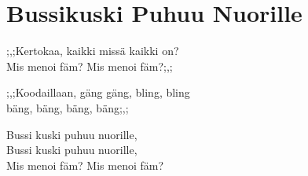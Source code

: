 \section{Bussikuski Puhuu Nuorille}
;,;Kertokaa, kaikki missä kaikki on?\\
Mis menoi fäm? Mis menoi fäm?;,;

;,;Koodaillaan, gäng gäng, bling, bling\\
bäng, bäng, bäng, bäng;,;

Bussi kuski puhuu nuorille,\\
Bussi kuski puhuu nuorille,\\
Mis menoi fäm? Mis menoi fäm?